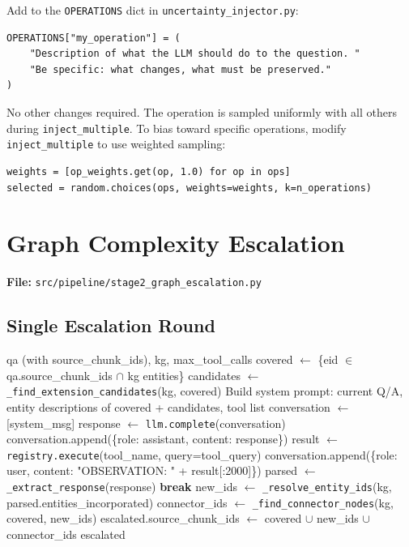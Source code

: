 \documentclass[11pt,a4paper]{article}
\begin{document}
Add to the \texttt{OPERATIONS} dict in \texttt{uncertainty\_injector.py}:
\begin{lstlisting}[style=py]
OPERATIONS["my_operation"] = (
    "Description of what the LLM should do to the question. "
    "Be specific: what changes, what must be preserved."
)
\end{lstlisting}

No other changes required. The operation is sampled uniformly with all others during \texttt{inject\_multiple}. To bias toward specific operations, modify \texttt{inject\_multiple} to use weighted sampling:
\begin{lstlisting}[style=py]
weights = [op_weights.get(op, 1.0) for op in ops]
selected = random.choices(ops, weights=weights, k=n_operations)
\end{lstlisting}

\section{Graph Complexity Escalation}
\label{sec:escalation}

\textbf{File:} \texttt{src/pipeline/stage2\_graph\_escalation.py}

\subsection{Single Escalation Round}

\begin{algorithm}
\caption{\texttt{GraphComplexityEscalator.\_escalate\_one\_round}}
\begin{algorithmic}[1]
\Require qa (with source\_chunk\_ids), kg, max\_tool\_calls
\State covered $\leftarrow$ \{eid $\in$ qa.source\_chunk\_ids $\cap$ kg entities\}
\State candidates $\leftarrow$ \texttt{\_find\_extension\_candidates}(kg, covered) 
\State Build system prompt: current Q/A, entity descriptions of covered + candidates, tool list
\State conversation $\leftarrow$ [system\_msg]
  \State response $\leftarrow$ \texttt{llm.complete}(conversation)
  \State conversation.append(\{role: assistant, content: response\})
    \State result $\leftarrow$ \texttt{registry.execute}(tool\_name, query=tool\_query)
    \State conversation.append(\{role: user, content: "OBSERVATION: " + result[:2000]\})
  \Else
    \State parsed $\leftarrow$ \texttt{\_extract\_response}(response) 
     \textbf{break} \EndIf
  \EndIf
\EndFor
\State new\_ids $\leftarrow$ \texttt{\_resolve\_entity\_ids}(kg, parsed.entities\_incorporated)
\State connector\_ids $\leftarrow$ \texttt{\_find\_connector\_nodes}(kg, covered, new\_ids)
\State escalated.source\_chunk\_ids $\leftarrow$ covered $\cup$ new\_ids $\cup$ connector\_ids
\Return escalated
\end{algorithmic}
\end{algorithm}
\end{document}
